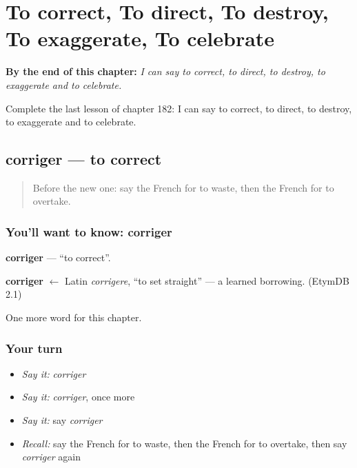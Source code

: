 
\chapter{To correct, To direct, To destroy, To exaggerate, To celebrate}
\label{ch:fr-to-correct-to-direct-to-destroy-to-exaggerate-to-celebrate}

\begin{chapteropening}
\textbf{By the end of this chapter:} \emph{I can say to correct, to direct, to destroy, to exaggerate and to celebrate.}

Complete the last lesson of chapter 182: I can say to correct, to direct, to destroy, to exaggerate and to celebrate.
\end{chapteropening}

\section[corriger]{corriger — to correct}

\label{lesson:FR-C182-corriger}



\begin{quote}
Before the new one: say the French for to waste, then the French for to overtake.
\end{quote}

\subsection*{You'll want to know: corriger}
\textbf{corriger} — \textquotedblleft{}to correct\textquotedblright{}.

\begin{cousinweb}
\textbf{corriger} $\leftarrow$ Latin \emph{corrigere}, \textquotedblleft{}to set straight\textquotedblright{} — a learned borrowing. (EtymDB 2.1)
\end{cousinweb}

\begin{grammarlens}[title={What you've built}]
One more word for this chapter.
\end{grammarlens}

\subsection*{Your turn}
\begin{itemize}
\raggedright
  \item \emph{Say it:} \emph{corriger}
  \item \emph{Say it:} \emph{corriger}, once more
  \item \emph{Say it:} say \emph{corriger}
  \item \emph{Recall:} say the French for to waste, then the French for to overtake, then say \emph{corriger} again
\end{itemize}

